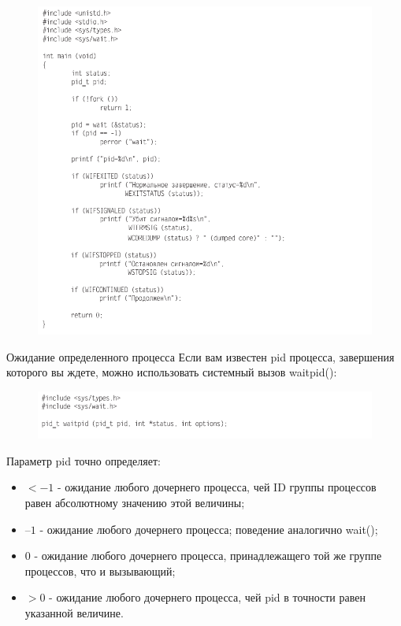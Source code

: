 \documentclass{beamer}
\begin{document}
\begin{frame}
\begin{figure}[h]
\centering
\includegraphics[scale=0.4]{images/lec07-pic14.png}
\end{figure}
\end{frame}

\begin{frame}{Ожидание определенного процесса}
Если вам известен pid процесса, завершения которого вы ждете, можно использовать системный вызов waitpid():
\begin{figure}[h]
\centering
\includegraphics[scale=0.5]{images/lec07-pic15.png}
\end{figure}
Параметр pid точно определяет:
\begin{itemize}
\item $< -1$ - ожидание любого дочернего процесса, чей ID группы процессов равен
абсолютному значению этой величины;
\item $–1$ - ожидание любого дочернего процесса; поведение аналогично wait();
\item $0$ - ожидание любого дочернего процесса, принадлежащего той же группе процессов, что и вызывающий;
\item $> 0$ - ожидание любого дочернего процесса, чей pid в точности равен указанной
величине.
\end{itemize}
\end{frame}
\end{document}
